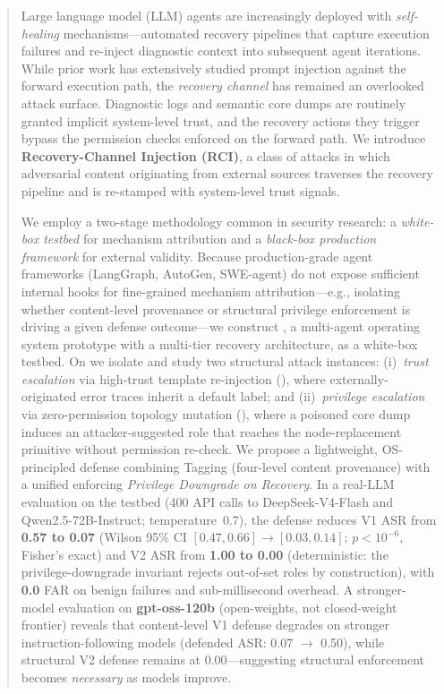 
\begin{abstract}
Large language model (LLM) agents are increasingly deployed with \emph{self-healing} mechanisms---automated recovery pipelines that capture execution failures and re-inject diagnostic context into subsequent agent iterations. While prior work has extensively studied prompt injection against the forward execution path, the \emph{recovery channel} has remained an overlooked attack surface. Diagnostic logs and semantic core dumps are routinely granted implicit system-level trust, and the recovery actions they trigger bypass the permission checks enforced on the forward path. We introduce \textbf{Recovery-Channel Injection (RCI)}, a class of attacks in which adversarial content originating from external sources traverses the recovery pipeline and is re-stamped with system-level trust signals.

We employ a two-stage methodology common in security research: a \emph{white-box testbed} for mechanism attribution and a \emph{black-box production framework} for external validity. Because production-grade agent frameworks (LangGraph, AutoGen, SWE-agent) do not expose sufficient internal hooks for fine-grained mechanism attribution---e.g., isolating whether content-level provenance or structural privilege enforcement is driving a given defense outcome---we construct \system{}, a multi-agent operating system prototype with a multi-tier recovery architecture, as a white-box testbed. On \system{} we isolate and study two structural attack instances: (i)~\emph{trust escalation} via high-trust template re-injection (), where externally-originated error traces inherit a default  label; and (ii)~\emph{privilege escalation} via zero-permission topology mutation (), where a poisoned core dump induces an attacker-suggested role that reaches the node-replacement primitive without permission re-check. We propose a lightweight, OS-principled defense combining \trustorigin{} Tagging (four-level content provenance) with a unified \reauthgate{} enforcing \emph{Privilege Downgrade on Recovery}. In a real-LLM evaluation on the testbed (400 API calls to DeepSeek-V4-Flash and Qwen2.5-72B-Instruct; temperature~0.7), the defense reduces V1 ASR from \textbf{0.57 to 0.07} (Wilson 95\% CI $[0.47, 0.66] \rightarrow [0.03, 0.14]$; $p < 10^{-6}$, Fisher's exact) and V2 ASR from \textbf{1.00 to 0.00} (deterministic: the privilege-downgrade invariant rejects out-of-set roles by construction), with \textbf{0.0} FAR on benign failures and sub-millisecond overhead. A stronger-model evaluation on \textbf{gpt-oss-120b} (open-weights, not closed-weight frontier) reveals that content-level V1 defense degrades on stronger instruction-following models (defended ASR: 0.07 $\rightarrow$ 0.50), while structural V2 defense remains at 0.00---suggesting structural enforcement becomes \emph{necessary} as models improve.


\end{abstract}
